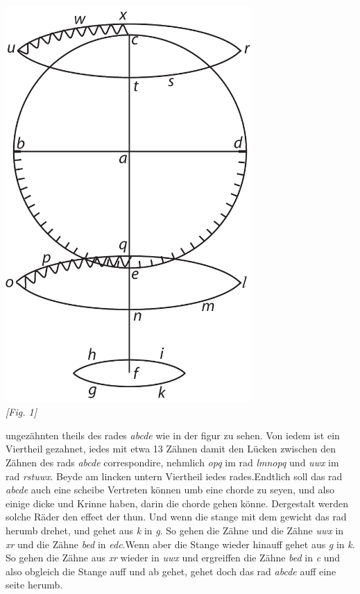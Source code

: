               \begin{center}
              \includegraphics[width=0.7\textwidth]{images/38_201r}
              \vspace{1.0ex}
              \\ \textit{[Fig. 1]} \\
              \end{center}
            ungez\"{a}hnten theils des rades \textit{abcde} wie in der figur zu sehen. Von iedem  ist ein Viertheil gezahnet, iedes mit etwa 13 Z\"{a}hnen damit den L\"{u}cken zwischen den Z\"{a}hnen des rads \textit{abcde} correspondire, nehmlich \textit{opq} im rad \textit{lmnopq} und \textit{uwx} im rad \textit{rstuwx}. Beyde am lincken untern Viertheil iedes rades.\pend \pstart Endtlich soll das rad \textit{abcde} auch eine scheibe Vertreten k\"{o}nnen umb eine chorde  zu seyen, und also einige dicke und Krinne haben, darin die chorde gehen k\"{o}nne. Dergestalt werden solche R\"{a}der den effect der \protect{} thun. Und wenn  die stange mit dem gewicht das rad herumb drehet, und gehet aus \textit{k} in \textit{g}. So gehen die Z\"{a}hne  und die Z\"{a}hne \textit{uwx} in \textit{xr} und die Z\"{a}hne \textit{bed} in \textit{edc}.\pend \pstart Wenn aber die Stange wieder  hinauff gehet aus \textit{g} in \textit{k}. So gehen die Z\"{a}hne aus \textit{xr} wieder in \textit{uwx} und ergreiffen die Z\"{a}hne \textit{bed} in \textit{c} und also obgleich die Stange auff und ab gehet, gehet doch das rad \textit{abcde} auff eine seite herumb.\pend 
            